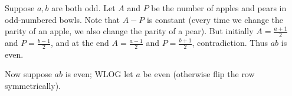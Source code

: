 Suppose $a,b$ are both odd. Let $A$ and $P$ be the number of apples and pears in odd-numbered bowls. Note that $A-P$ is constant (every time we change the parity of an apple, we also change the parity of a pear). But initially $A=\frac{a+1}{2}$ and $P=\frac{b-1}{2}$, and at the end $A=\frac{a-1}{2}$ and $P=\frac{b+1}{2}$, contradiction. Thus $ab$ is even.

Now suppose $ab$ is even; WLOG let $a$ be even (otherwise flip the row symmetrically).